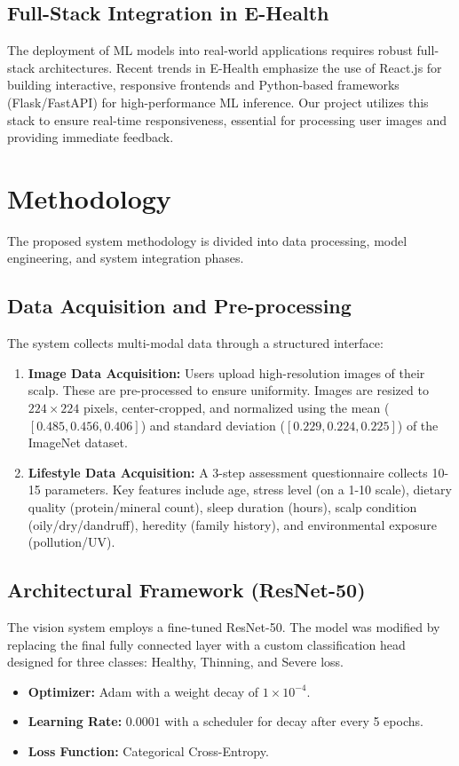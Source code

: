 \documentclass[conference]{IEEEtran}
\begin{document}
\subsection{Full-Stack Integration in E-Health}
The deployment of ML models into real-world applications requires robust full-stack architectures. Recent trends in E-Health emphasize the use of React.js for building interactive, responsive frontends and Python-based frameworks (Flask/FastAPI) for high-performance ML inference. Our project utilizes this stack to ensure real-time responsiveness, essential for processing user images and providing immediate feedback.

\section{Methodology}
The proposed system methodology is divided into data processing, model engineering, and system integration phases.

\subsection{Data Acquisition and Pre-processing}
The system collects multi-modal data through a structured interface:
\begin{enumerate}
    \item \textbf{Image Data Acquisition:} Users upload high-resolution images of their scalp. These are pre-processed to ensure uniformity. Images are resized to $224 \times 224$ pixels, center-cropped, and normalized using the mean ($[0.485, 0.456, 0.406]$) and standard deviation ($[0.229, 0.224, 0.225]$) of the ImageNet dataset.
    \item \textbf{Lifestyle Data Acquisition:} A 3-step assessment questionnaire collects 10-15 parameters. Key features include age, stress level (on a 1-10 scale), dietary quality (protein/mineral count), sleep duration (hours), scalp condition (oily/dry/dandruff), heredity (family history), and environmental exposure (pollution/UV).
\end{enumerate}

\subsection{Architectural Framework (ResNet-50)}
The vision system employs a fine-tuned ResNet-50. The model was modified by replacing the final fully connected layer with a custom classification head designed for three classes: Healthy, Thinning, and Severe loss.
\begin{itemize}
    \item \textbf{Optimizer:} Adam with a weight decay of $1\times 10^{-4}$.
    \item \textbf{Learning Rate:} $0.0001$ with a scheduler for decay after every 5 epochs.
    \item \textbf{Loss Function:} Categorical Cross-Entropy.
\end{itemize}
\end{document}
